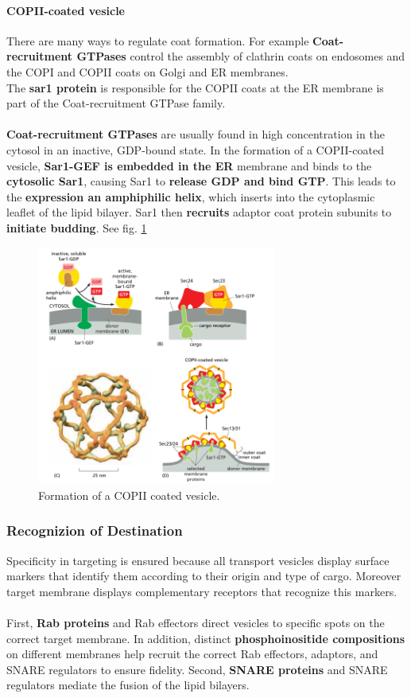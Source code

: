 \documentclass[../main.tex]{subfiles}
\begin{document}
\paragraph{COPII-coated vesicle}
There are many ways to regulate coat formation. For example \textbf{Coat-recruitment GTPases} control the assembly of clathrin coats on endosomes and the COPI and COPII coats on Golgi and ER membranes.\\
The \textbf{\gls{sar1} protein} is responsible for the COPII coats at the ER membrane is part of the Coat-recruitment GTPase family. \\
\\
\textbf{Coat-recruitment GTPases} are usually found in high concentration in the cytosol in an inactive, GDP-bound state. In the formation of a COPII-coated vesicle, \textbf{Sar1-GEF is embedded in the ER} membrane and binds to the \textbf{cytosolic Sar1}, causing Sar1 to \textbf{release GDP and bind GTP}. This leads to the \textbf{expression an amphiphilic helix}, which inserts into the cytoplasmic leaflet of the lipid bilayer. Sar1 then \textbf{recruits} adaptor coat protein subunits to \textbf{initiate budding}. See fig. \ref{COPII}

\begin{figure}[H]
	\centering
	\includegraphics[width=0.7\textwidth]{11}
	\caption{Formation of a COPII coated vesicle.}
	\label{COPII}
\end{figure}


\subsubsection{Recognizion of Destination}
Specificity in targeting is ensured because all transport vesicles display surface markers that identify them according to their origin and type of cargo. Moreover target membrane displays complementary receptors that recognize this markers. \\
\\
First, \textbf{Rab proteins} and Rab effectors direct vesicles to specific spots on the correct target membrane. In addition, distinct \textbf{phosphoinositide compositions} on different membranes help recruit the correct Rab effectors, adaptors, and SNARE regulators to ensure fidelity. Second, \textbf{SNARE proteins} and SNARE regulators mediate the fusion of the lipid bilayers.
\end{document}
